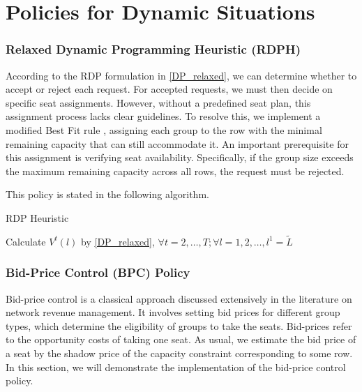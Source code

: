 \newpage

\appendix
\section{Policies for Dynamic Situations}\label{policies}

\subsubsection*{Relaxed Dynamic Programming Heuristic (RDPH)}

According to the RDP formulation in \eqref{DP_relaxed}, we can determine whether to accept or reject each request. For accepted requests, we must then decide on specific seat assignments. However, without a predefined seat plan, this assignment process lacks clear guidelines. To resolve this, we implement a modified Best Fit rule \citep{johnson1974fast}, assigning each group to the row with the minimal remaining capacity that can still accommodate it. An important prerequisite for this assignment is verifying seat availability. Specifically, if the group size exceeds the maximum remaining capacity across all rows, the request must be rejected.

This policy is stated in the following algorithm.

\begin{algorithm}[H]
  \caption{RDP Heuristic}\label{algo_dp_heuris}
  Calculate $V^{t}(l)$ by \eqref{DP_relaxed}, $\forall t =2, \ldots, T; \forall l = 1, 2, \ldots, l^{1}=\tilde{L}$\;
\end{algorithm}

\subsubsection*{Bid-Price Control (BPC) Policy}
Bid-price control is a classical approach discussed extensively in the literature on network revenue management. It involves setting bid prices for different group types, which determine the eligibility of groups to take the seats. Bid-prices refer to the opportunity costs of taking one seat. As usual, we estimate the bid price of a seat by the shadow price of the capacity constraint corresponding to some row. In this section, we will demonstrate the implementation of the bid-price control policy. 

